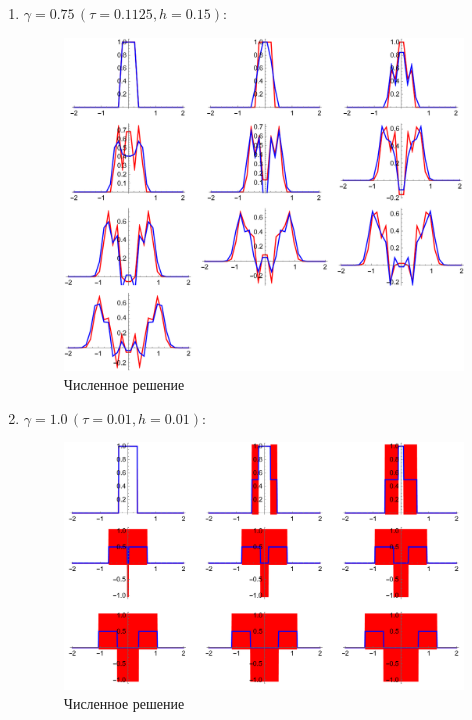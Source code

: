 \documentclass[12pt, a4paper]{article}
\begin{document}
\begin{enumerate}
\item $\gamma =0.75\,(\tau = 0.1125 ,h =0.15)$:
\begin{figure}[H]
	\centering
	\includegraphics[width=0.7\linewidth]{task1_0.75}
	\caption{Численное решение}
\end{figure}
\newpage
\item $\gamma =1.0\,(\tau = 0.01 ,h =0.01)$:
\begin{figure}[H]
	\centering
	\includegraphics[width=0.7\linewidth]{task1_1.0}
	\caption{Численное решение}
\end{figure}
\end{enumerate}
\end{document}
